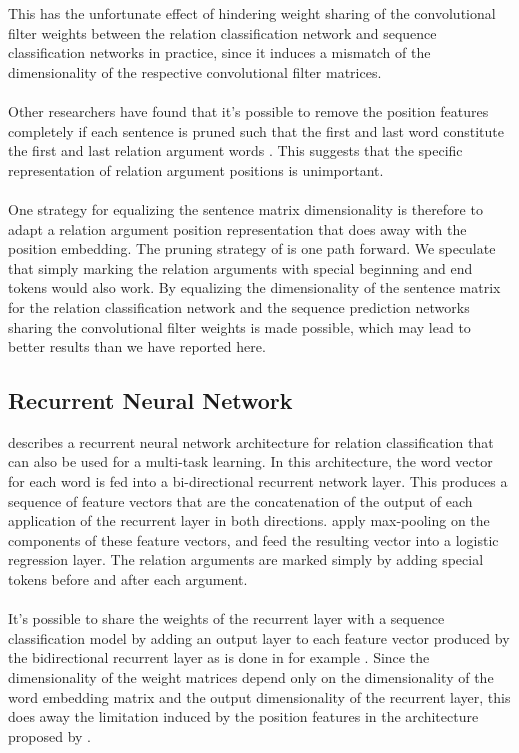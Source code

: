 This has the unfortunate effect of hindering weight sharing of the convolutional filter weights between the relation classification network and sequence classification networks in practice, since it induces a mismatch of the dimensionality of the respective convolutional filter matrices.
\\\\
Other researchers have found that it's possible to remove the position features completely if each sentence is pruned such that the first and last word constitute the first and last relation argument words \citep{santos2015}. This suggests that the specific representation of relation argument positions is unimportant.
\\\\
One strategy for equalizing the sentence matrix dimensionality is therefore to adapt a relation argument position representation that does away with the position embedding. The pruning strategy of \citep{santos2015} is one path forward. We speculate that simply marking the relation arguments with special beginning and end tokens would also work. By equalizing the dimensionality of the sentence matrix for the relation classification network and the sequence prediction networks sharing the convolutional filter weights is made possible, which may lead to better results than we have reported here.

\subsection{Recurrent Neural Network}
\citet{zhang2015} describes a recurrent neural network architecture for relation classification that can also be used for a multi-task learning. In this architecture, the word vector for each word is fed into a bi-directional recurrent network layer. This produces a sequence of feature vectors that are the concatenation of the output of each application of the recurrent layer in both directions. \citet{zhang2015} apply max-pooling on the components of these feature vectors, and feed the resulting vector into a logistic regression layer. The relation arguments are marked simply by adding special tokens before and after each argument.
\\\\
It's possible to share the weights of the recurrent layer with a sequence classification model by adding an output layer to each feature vector produced by the bidirectional recurrent layer as is done in for example \citet{bingel2017}. Since the dimensionality of the weight matrices depend only on the dimensionality of the word embedding matrix and the output dimensionality of the recurrent layer, this does away the limitation induced by the position features in the architecture proposed by \citet{nguyen2015}.

